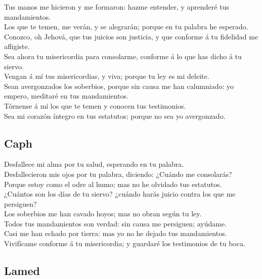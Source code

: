  Tus manos me hicieron y me formaron: hazme entender, y
aprenderé tus mandamientos.\\
 Los que te temen, me verán, y se alegrarán; porque en tu
palabra he esperado.\\
 Conozco, oh Jehová, que tus juicios son justicia, y que
conforme á tu fidelidad me afligiste.\\
 Sea ahora tu misericordia para consolarme, conforme á lo
que has dicho á tu siervo.\\
 Vengan á mí tus misericordias, y viva; porque tu ley es mi
deleite.\\
 Sean avergonzados los soberbios, porque sin causa me han
calumniado: yo empero, meditaré en tus mandamientos.\\
 Tórnense á mí los que te temen y conocen tus
testimonios.\\
 Sea mi corazón íntegro en tus estatutos; porque no sea yo
avergonzado.

\hypertarget{caph}{%
\subsection{Caph}\label{caph}}

 Desfallece mi alma por tu salud, esperando en tu
palabra.\\
 Desfallecieron mis ojos por tu palabra, diciendo: ¿Cuándo
me consolarás?\\
 Porque estoy como el odre al humo; mas no he olvidado tus
estatutos.\\
 ¿Cuántos son los días de tu siervo? ¿cuándo harás juicio
contra los que me persiguen?\\
 Los soberbios me han cavado hoyos; mas no obran según tu
ley.\\
 Todos tus mandamientos son verdad: sin causa me persiguen;
ayúdame.\\
 Casi me han echado por tierra: mas yo no he dejado tus
mandamientos.\\
 Vivifícame conforme á tu misericordia; y guardaré los
testimonios de tu boca.

\hypertarget{lamed}{%
\subsection{Lamed}\label{lamed}}

